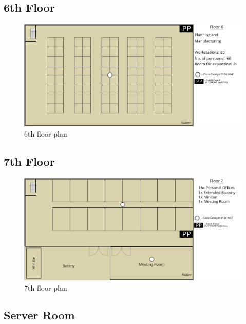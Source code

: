 \subsection{6th Floor}
\begin{figure}[H]
    \includegraphics[width=15cm]{Figures/6th-Floor.png}
    \caption{6th floor plan}
    \label{fig:6th_floor}
\end{figure}
\subsection{7th Floor}
\begin{figure}[H]
    \includegraphics[width=15cm]{Figures/7th-floor.png}
    \caption{7th floor plan}
    \label{fig:7th_floor}
\end{figure}
\subsection{Server Room}

